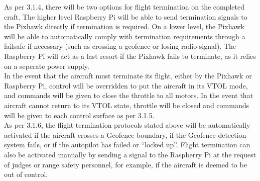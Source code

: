 As per 3.1.4, there will be two options for flight termination on the completed craft. The higher level Raspberry Pi will be able to send termination signals to the Pixhawk directly if termination is required.  On a lower level, the Pixhawk will be able to automatically comply with termination requirements through a failsafe if necessary (such as crossing a geofence or losing radio signal). The Raspberry Pi will act as a last resort if the Pixhawk fails to terminate, as it relies on a seperate power supply.\\

In the event that the aircraft must terminate its flight, either by the Pixhawk or Raspberry Pi, control will be overridden to put the aircraft in its VTOL mode, and commands will be given to close the throttle to all motors.
In the event that aircraft cannot return to its VTOL state, throttle will be closed and commands will be given to each control surface as per 3.1.5.\\

As per 3.1.6, the flight termination protocols stated above will be automatically activated if the aircraft crosses a Geofence boundary, if the Geofence detection system fails, or if the autopilot has failed or ``locked up''. Flight termination can also be activated manually by sending a signal to the Raspberry Pi at the request of judges or range safety personnel, for example, if the aircraft is deemed to be out of control.
